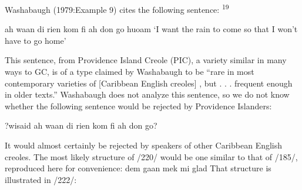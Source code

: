 Washabaugh (1979:Example 9) cites the following sentence: \textsuperscript{19}

\ea\label{ex:2:220}
 ah waan di rien kom fi ah don go huoam
\glt `I want the rain to come so that I won't have to go home'
\z



This sentence, from Providence Island Creole (PIC), a variety similar in many ways to GC, is of a type claimed by Washabaugh to be ``rare in most contemporary varieties of [Caribbean English creoles] , but . . . frequent enough in older texts.'' Washabaugh does not analyze this sentence, so we do not know whether the following sentence would be rejected by Providence Islanders:

\ea\label{ex:2:221}
 ?wisaid ah waan di rien kom fi ah don go?
\z

It would almost certainly be rejected by speakers of other Caribbean English creoles.
The most likely structure of /220/ would be one similar to that
of /185/, reproduced here for convenience: dem gaan mek mi glad
That structure is illustrated in /222/:



\ea\label{ex:2:222}
\z

